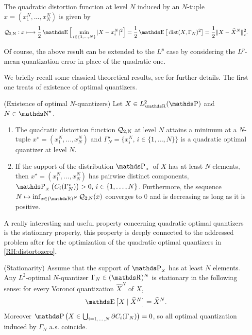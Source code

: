 \begin{definition}
	The quadratic distortion function at level $N$ induced by an $N$-tuple $x = (x_1^N, \dots, x_N^N) $ is given by
	\begin{equation*}
		\Distortion : x \longmapsto \frac{1}{2} \E \Big[ \min_{i \in \{ 1, \dots, N \} } \vert X - x_i^N \vert^2 \Big] = \frac{1}{2} \E \big[ \dist ( X, \Gamma_N )^2 \big] = \frac{1}{2} \Vert X - \widehat X^N \Vert_{_2}^2 .
	\end{equation*}
\end{definition}

Of course, the above result can be extended to the $L^p$ case by considering the $L^p$-mean quantization error in place of the quadratic one.


We briefly recall some classical theoretical results, see \cite{graf2000foundations,pages2018numerical} for further details. The first one treats of existence of optimal quantizers.
\begin{theorem}{(Existence of optimal $N$-quantizers)}\label{RH:existence}
	Let $X \in L^2_{\R} ( \Prob )$ and $N \in \Integer^{\star}$.
	\begin{enumerate}[label=(\alph*)]
		\item The quadratic distortion function $\operatorname{\mathcal{Q}_{2,N}}$ at level $N$ attains a minimum at a $N$-tuple $x^{\star} = ( x_1^N, \dots, x_N^N )$ and $\Gamma_N^{\star} = \big\{ x_i^{N}, \, i \in \{ 1, \dots, N \}  \big\}$ is a quadratic optimal quantizer at level $N$.
		\item If the support of the distribution $\Prob_{_{X}}$ of $X$ has at least $N$ elements, then $x^{\star} = ( x_1^N, \dots, x_N^N )$ has pairwise distinct components, $ \Prob_{_{X}} \big( C_i ( \Gamma_N^{\star} ) \big) > 0, \, i \in \{ 1, \dots, N \} $. Furthermore, the sequence $N \mapsto \inf_{x \in ( \R )^N} \Distortion( x )$ converges to $0$ and is decreasing as long as it is positive.
	\end{enumerate}
\end{theorem}


A really interesting and useful property concerning quadratic optimal quantizers is the stationary property, this property is deeply connected to the addressed problem after for the optimization of the quadratic optimal quantizers in \eqref{RH:distortozero}.


\begin{proposition}{(Stationarity)}\label{RH:stationary_property}
	Assume that the support of $\Prob_{_{X}}$ has at least $N$ elements. Any $L^2$-optimal $N$-quantizer $\Gamma_N \in ( \R )^N$ is stationary in the following sense: for every Vorono\"{i} quantization $\widehat X^N$ of $X$,
	\begin{equation*}
		\E \big[ X \mid \widehat X^N \big] = \widehat X^N.
	\end{equation*}
	Moreover $\Prob \big( X \in \bigcup_{i = 1, \dots, N} \partial C_i (\Gamma_N) \big) = 0$, so all optimal quantization induced by $\Gamma_N$ a.s. coincide.
\end{proposition}

